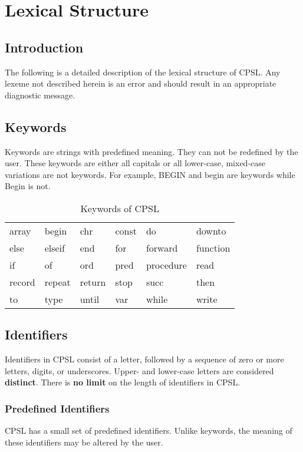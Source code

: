 \documentclass{book}
\begin{document}
\chapter{Lexical Structure}
\section{Introduction}
The following is a detailed description of the lexical structure of CPSL.
Any lexeme not described herein is an error and should result in an appropriate diagnostic message.
\section{Keywords}
Keywords are strings with predefined meaning.  
They can not be redefined by the user.
These keywords are either all capitals or all lower-case, 
mixed-case variations are not keywords.
For example, BEGIN and begin are keywords while Begin is not.

\begin{table}[h!]
\begin{center}
\begin{tabular}{llllll}
array & begin & chr & const & do & downto \\
else & elseif & end & for & forward & function \\
if & of & ord & pred & procedure & read \\
record & repeat & return & stop & succ & then \\
to & type & until & var & while & write \\
\end{tabular}
\end{center}
\caption{Keywords of CPSL}
\end{table}
\section{Identifiers}
Identifiers in CPSL consist of a letter, followed by a sequence of zero or more letters, digits, or underscores.
Upper- and lower-case letters are considered \textbf{distinct}.
There is \textbf{no limit} on the length of identifiers in CPSL.
\subsection{Predefined Identifiers}
CPSL has a small set of predefined identifiers.
Unlike keywords, the meaning of these identifiers may be altered by the user.
\end{document}
